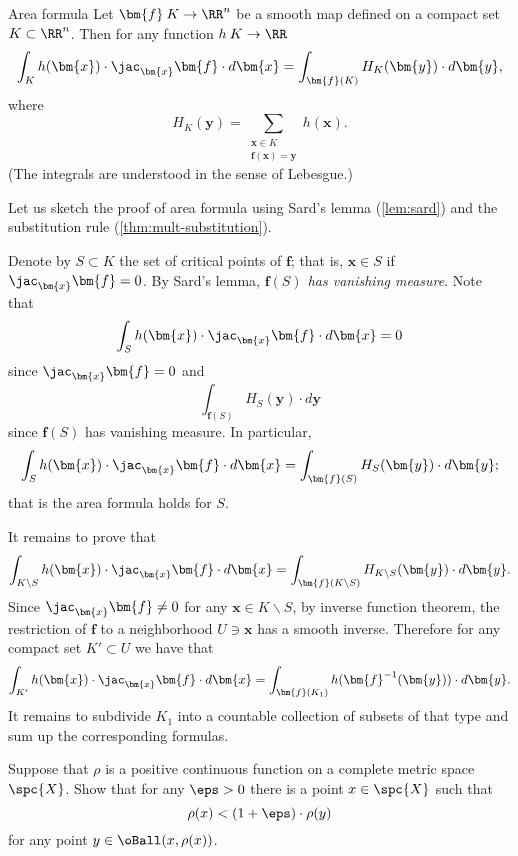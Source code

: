 \begin{thm}{Area formula}\label{thm:area-formula}
Let $\bm{f}\:K\to\RR^n$ be a smooth map defined on a compact set $K\subset \RR^n$.
Then for any function $h\:K\to \RR$
\[\int_K h(\bm{x})\cdot \jac_{\bm{x}}\bm{f}\cdot d\bm{x}=\int_{\bm{f}(K)} H_K(\bm{y})\cdot d\bm{y},\]
where 
\[H_K(\bm{y})=\sum_{\substack{\bm{x}\in K \\ \bm{f}(\bm{x})=\bm{y}}}h(\bm{x}).\]
(The integrals are understood in the sense of Lebesgue.)
\end{thm}

Let us sketch the proof of area formula using  Sard's lemma (\ref{lem:sard}) and the substitution rule (\ref{thm:mult-substitution}).

Denote by $S\subset K$ the set of critical points of $\bm{f}$; that is, $\bm{x}\in S$ if $\jac_{\bm{x}}\bm{f}=0$.
By Sard's lemma,
\emph{$\bm{f}(S)$ has vanishing measure}.
Note that 
\[\int_S h(\bm{x})\cdot \jac_{\bm{x}}\bm{f}\cdot d\bm{x}=0\]
since $\jac_{\bm{x}}\bm{f}=0$
and
\[\int_{\bm{f}(S)} H_S(\bm{y})\cdot d\bm{y}\]
since $\bm{f}(S)$ has vanishing measure.
In particular,
\[\int_S h(\bm{x})\cdot \jac_{\bm{x}}\bm{f}\cdot d\bm{x}=\int_{\bm{f}(S)} H_S(\bm{y})\cdot d\bm{y};\]
that is the area formula holds for $S$.

It remains to prove that 
\[\int_{K\backslash S} h(\bm{x})\cdot \jac_{\bm{x}}\bm{f}\cdot d\bm{x}=\int_{\bm{f}(K\backslash S)} H_{K\backslash S}(\bm{y})\cdot d\bm{y}.\]
Since $\jac_{\bm{x}}\bm{f}\ne 0$ for any $\bm{x}\in K\backslash S$, by inverse function theorem, the restriction of $\bm{f}$ to a neighborhood $U\ni\bm{x}$ has a smooth inverse.
Therefore for any compact set $K'\subset U$ we have that
\[\int_{K'}h(\bm{x})\cdot \jac_{\bm{x}}\bm{f}\cdot d\bm{x}=\int_{\bm{f}(K_1)} h(\bm{f}^{-1}(\bm{y}))\cdot d\bm{y}.\]
It remains to subdivide $K_1$ into a countable collection of subsets of that type and sum up the corresponding formulas.\qeds

















\newpage
\pagestyle{empty}

\noindent Suppose that $\rho$ is a positive continuous function on a complete metric space $\spc{X}$.
Show that for any $\eps>0$ there is a point $x\in \spc{X}$ such that 
\[\rho(x)<(1+\eps)\cdot\rho(y)\]
for any point $y\in \oBall(x,\rho(x))$.

